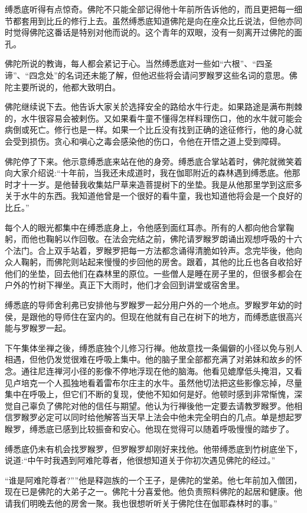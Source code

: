 \documentclass[12pt,twoside,openany]{book}
\begin{document}
缚悉底听得有点惊奇。佛陀不只能全部记得他十年前所告诉他的，而且更把每一细节都套用到比丘的修行上去。虽然缚悉底知道佛陀是向在座众比丘说法，但他亦同时觉得佛陀这番话是特别对他而说的。这个青年的双眼，没有一刻离开过佛陀的面孔。

佛陀所说的教诲，每人都会紧记于心。当然缚悉底对一些如“六根”、“四圣谛”、“四念处”的名词还未能了解，但他迟些将会请问罗睺罗这些名词的意思。佛陀主要所说的，他都大致明白。

佛陀继续说下去。他告诉大家关於选择安全的路给水牛行走。如果路途是满布荆棘的，水牛很容易会被剌伤。又如果看牛童不懂得怎样料理伤口，他的水牛就可能会病倒或死亡。修行也是一样。如果一个比丘没有找到正确的途征修行，他的身心就会受到损伤。贪心和嗔心之毒会感染他的伤口，令他在开悟之道上受到障碍。

佛陀停了下来。他示意缚悉底来站在他的身旁。缚悉底合掌站着时，佛陀就微笑着向大家介绍说:“十年前，当我还未成道时，我在伽耶附近的森林遇到缚悉底。他那时才十一岁。是他替我收集姑尸草来造菩提树下的坐垫。我是从他那里学到这麽多关于水牛的东西。我知道他曾是一个很好的看牛童，我也知道他将会是一个良好的比丘。”

每个人的眼光都集中在缚悉底身上，令他感到面红耳赤。所有的人都向他合掌鞠躬，而他也鞠躬以作回敬。在法会完结之前，佛陀请罗睺罗朗诵出观想呼吸的十六个法门。合上双手站着，罗睺罗把每一方法都念诵得清脆如铃声。念完毕後，他向众人鞠躬，而佛陀则站起来慢慢的步回他的房舍。跟着，其他的比丘也各自收拾好他们的坐垫，回去他们在森林里的原位。一些僧人是睡在房子里的，但很多都会在户外的竹树下禅坐。真正下大雨时，他们才会回到讲堂或宿舍里。

缚悉底的导师舍利弗已安排他与罗睺罗一起分用户外的一个地点。罗睺罗年幼的时侯，是跟他的导师住在室内的。但现在他就有自己在树下的地方，而缚悉底很高兴能与罗睺罗一起。

下午集体坐禅之後，缚悉底独个儿修习行禅。他故意找一条偏僻的小径以免与别人相遇，但他仍发觉很难在呼吸上集中。他的脑子里全部都充满了对弟妹和故乡的怀念。通往尼连禅河小径的影像不停地浮现在他的脑海。他看见媲摩低头掩泪，又看见卢培克一个人孤独地看着雷布尔庄主的水牛。虽然他切法把这些影像忘掉，尽量集中在呼吸上，但它们不断的复现，使他不知如何是好。他顿时感到非常惭愧，深觉自己辜负了佛陀对他的信任与期望。他认为行禅後他一定要去请教罗睺罗。他相信罗睺罗必定可以同时给他解答当天早上法会中他未完全明白的几点。单是想起罗睺罗，缚悉底已感到比较振奋和安心。他现在觉得可以随着呼吸慢慢的踏步了。

缚悉底仍未有机会找罗睺罗，但罗睺罗却刚好来找他。他带缚悉底到竹树底坐下，说道:“中午时我遇到阿难陀尊者，他很想知道关于你初次遇见佛陀的经过。”

“谁是阿难陀尊者?””他是释迦族的一个王子，是佛陀的堂弟。他七年前加入僧团，现在已是佛陀的大弟子之一。佛陀十分喜爱他。他负责照料佛陀的起居和健康。他请我们明晚去他的房舍一聚。我也很想听听关于佛陀住在伽耶森林时的事。”
\end{document}
